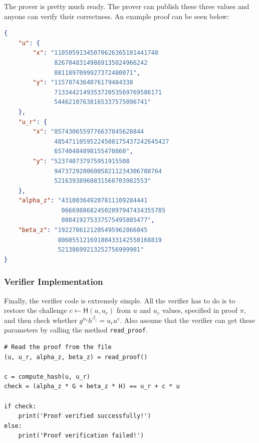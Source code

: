 \documentclass[../../book.tex]{subfiles}
\begin{document}
The prover is pretty much ready. The prover can publish these three values and anyone 
can verify their correctness. An example proof can be seen below:
\begin{center}
    \begin{tcolorbox}[enhanced,
        width=0.925\textwidth,
        title=\textbf{proof.json},
        coltitle=gray!25!black,
        attach boxed title to top center={yshift=-2mm,yshifttext=-1mm},
        boxed title style={size=small,colframe=gray!75!black,
        colback=purple!30!white,boxrule=1pt},
        top=-0.35cm,
        bottom=-0.35cm]
\begin{lstlisting}[language=JSON,numbers=none,basicstyle=\ttfamily\scriptsize]
{
    "u": {
        "x": "11050591345070626365101441740
              82670483149869135024966242
              0811897099927372480071",
        "y": "1157074364076179484338
              713344214935372053569769586171
              54462107638165337575096741"
    },
    "u_r": {
        "x": "8574306559776637845628844
              48547110595224508175437242645427
              65740484898155470860",
        "y": "523740737975951915508
              947372920060058211234306708764
              52163938960831568703982553"
    },
    "alpha_z": "431003649207811109284441
                06669886824502097947434355785
                088419275337575495885477",
    "beta_z": "1922706121205495962866045
               80605512169180433142550168819
               52138699213252756999901"
}
        \end{lstlisting}
    \end{tcolorbox}
\end{center}

\subsubsection{Verifier Implementation}

Finally, the verifier code is extremely simple. All the verifier has to do is to
restore the challenge $c \gets \mathsf{H}(u,u_r)$ from $u$ and $u_r$ values, specified in
proof $\pi$, and then check whether $g^{\alpha_z}h^{\beta_z}=u_ru^c$. Also assume 
that the verifier can get these parameters by calling the method \texttt{read\_proof}.
\begin{verbatim}
# Read the proof from the file
(u, u_r, alpha_z, beta_z) = read_proof()

c = compute_hash(u, u_r)
check = (alpha_z * G + beta_z * H) == u_r + c * u

if check:
    print('Proof verified successfully!')
else:
    print('Proof verification failed!')
\end{verbatim}
\end{document}
